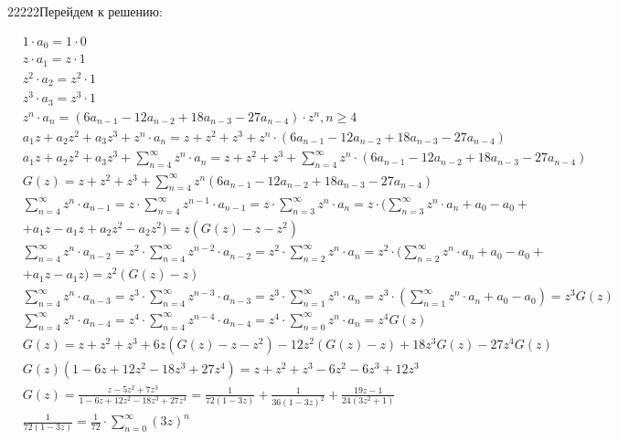 \documentclass[a4paper,12pt,numbers=noenddot]{scrreprt}
\begin{document}
\begin{flushleft}
22222Перейдем к решению:

\begin{align}
    & 1 \cdot a_0 = 1 \cdot 0 \\&
    z \cdot a_1 = z \cdot 1 \\&
    z^2 \cdot a_2 = z^2 \cdot 1 \\&
    z^3 \cdot a_3 = z^3 \cdot 1 \\&
    z^n \cdot a_n = (6a_{n-1}-12a_{n-2}+18a_{n-3}-27a_{n-4}) \cdot z^n, n \geq 4\\&
    a_1 z + a_2 z^2 + a_3 z^3 + z^n \cdot a_n = z + z^2 + z^3 + z^n \cdot (6a_{n-1}-12a_{n-2}+18a_{n-3}-27a_{n-4}) \\&
    a_1 z + a_2 z^2 + a_3 z^3 + \sum_{n=4}^{\infty} z^n \cdot a_n = z + z^2 + z^3 + \sum_{n=4}^{\infty} z^n \cdot (6a_{n-1}-12a_{n-2}+18a_{n-3}-27a_{n-4}) \\&
    G(z) = z + z^2 + z^3 + \sum_{n=4}^{\infty} z^n (6a_{n-1}-12a_{n-2}+18a_{n-3}-27a_{n-4}) \\&
    \sum_{n=4}^{\infty} z^n \cdot a_{n-1} = z \cdot \sum_{n=4}^{\infty} z^{n-1} \cdot a_{n-1} = z \cdot \sum_{n=3}^{\infty} z^n \cdot a_n = z \cdot (\sum_{n=3}^{\infty} z^n \cdot a_n + a_0 - a_0 + \\&
    +a_1 z - a_1 z + a_2 z^2 - a_2 z^2) = z(G(z)-z-z^2) \\&
    \sum_{n=4}^{\infty} z^n \cdot a_{n-2} = z^2 \cdot \sum_{n=4}^{\infty} z^{n-2} \cdot a_{n-2} = z^2 \cdot \sum_{n=2}^{\infty} z^n \cdot a_n = z^2 \cdot (\sum_{n=2}^{\infty} z^n \cdot a_n + a_0 - a_0 + \\&
    +a_1 z - a_1 z) = z^2(G(z)-z) \\&
    \sum_{n=4}^{\infty} z^n \cdot a_{n-3} = z^3 \cdot \sum_{n=4}^{\infty} z^{n-3} \cdot a_{n-3} = z^3 \cdot \sum_{n=1}^{\infty} z^n \cdot a_n = z^3 \cdot (\sum_{n=1}^{\infty} z^n \cdot a_n + a_0 - a_0) = z^3 G(z) \\&
    \sum_{n=4}^{\infty} z^n \cdot a_{n-4} = z^4 \cdot \sum_{n=4}^{\infty} z^{n-4} \cdot a_{n-4} = z^4 \cdot \sum_{n=0}^{\infty} z^n \cdot a_n = z^4 G(z) \\&
    G(z)= z + z^2 + z^3 + 6z(G(z)-z-z^2)-12z^2(G(z)-z)+18z^3G(z)-27z^4G(z) \\&
    G(z)(1-6z+12z^2-18z^3+27z^4)=z+z^2+z^3-6z^2-6z^3+12z^3 \\&
    G(z)=\frac{z-5z^2+7z^3}{1-6z+12z^2-18z^3+27z^4} = \frac{1}{72(1-3z)}+\frac{1}{36(1-3z)^2}+\frac{19z-1}{24(3z^2+1)} \\&
    \frac{1}{72(1-3z)} = \frac{1}{72} \cdot \sum_{n=0}^{\infty} (3z)^n  \\&

\end{align}
\end{flushleft}
\end{document}
